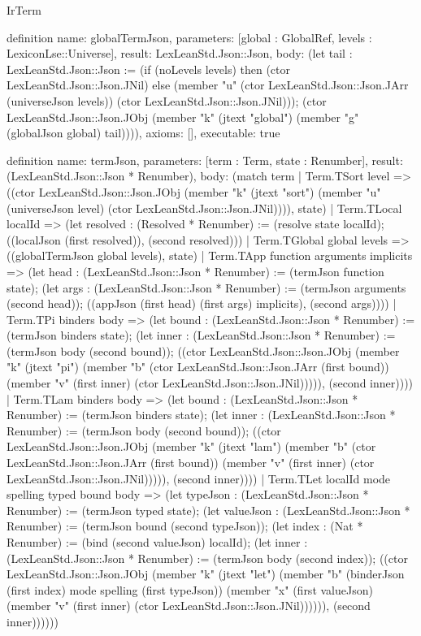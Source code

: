 \begin{lexlean}{IrTerm}
\begin{semanticmodule}
definition{
  name: globalTermJson,
  parameters: [global : GlobalRef, levels : LexiconLse::Universe],
  result: LexLeanStd.Json::Json,
  body: (let tail : LexLeanStd.Json::Json := (if (noLevels levels) then (ctor LexLeanStd.Json::Json.JNil) else (member "u" (ctor LexLeanStd.Json::Json.JArr (universeJson levels)) (ctor LexLeanStd.Json::Json.JNil))); (ctor LexLeanStd.Json::Json.JObj (member "k" (jtext "global") (member "g" (globalJson global) tail)))),
  axioms: [],
  executable: true
}

definition{
  name: termJson,
  parameters: [term : Term, state : Renumber],
  result: (LexLeanStd.Json::Json * Renumber),
  body: (match term
    | Term.TSort level => ((ctor LexLeanStd.Json::Json.JObj (member "k" (jtext "sort") (member "u" (universeJson level) (ctor LexLeanStd.Json::Json.JNil)))), state)
    | Term.TLocal localId => (let resolved : (Resolved * Renumber) := (resolve state localId); ((localJson (first resolved)), (second resolved)))
    | Term.TGlobal global levels => ((globalTermJson global levels), state)
    | Term.TApp function arguments implicits => (let head : (LexLeanStd.Json::Json * Renumber) := (termJson function state); (let args : (LexLeanStd.Json::Json * Renumber) := (termJson arguments (second head)); ((appJson (first head) (first args) implicits), (second args))))
    | Term.TPi binders body => (let bound : (LexLeanStd.Json::Json * Renumber) := (termJson binders state); (let inner : (LexLeanStd.Json::Json * Renumber) := (termJson body (second bound)); ((ctor LexLeanStd.Json::Json.JObj (member "k" (jtext "pi") (member "b" (ctor LexLeanStd.Json::Json.JArr (first bound)) (member "v" (first inner) (ctor LexLeanStd.Json::Json.JNil))))), (second inner))))
    | Term.TLam binders body => (let bound : (LexLeanStd.Json::Json * Renumber) := (termJson binders state); (let inner : (LexLeanStd.Json::Json * Renumber) := (termJson body (second bound)); ((ctor LexLeanStd.Json::Json.JObj (member "k" (jtext "lam") (member "b" (ctor LexLeanStd.Json::Json.JArr (first bound)) (member "v" (first inner) (ctor LexLeanStd.Json::Json.JNil))))), (second inner))))
    | Term.TLet localId mode spelling typed bound body => (let typeJson : (LexLeanStd.Json::Json * Renumber) := (termJson typed state); (let valueJson : (LexLeanStd.Json::Json * Renumber) := (termJson bound (second typeJson)); (let index : (Nat * Renumber) := (bind (second valueJson) localId); (let inner : (LexLeanStd.Json::Json * Renumber) := (termJson body (second index)); ((ctor LexLeanStd.Json::Json.JObj (member "k" (jtext "let") (member "b" (binderJson (first index) mode spelling (first typeJson)) (member "x" (first valueJson) (member "v" (first inner) (ctor LexLeanStd.Json::Json.JNil)))))), (second inner))))))
}
\end{semanticmodule}
\end{lexlean}

